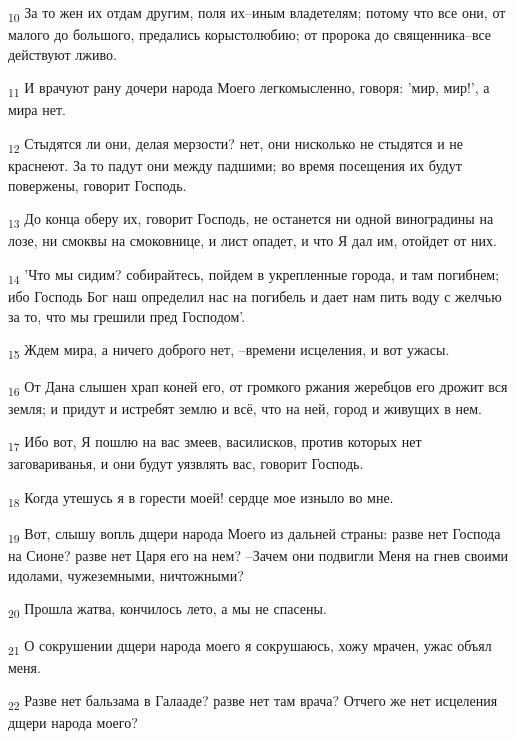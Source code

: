 \begin{tcolorbox}
\textsubscript{10} За то жен их отдам другим, поля их--иным владетелям; потому что все они, от малого до большого, предались корыстолюбию; от пророка до священника--все действуют лживо.
\end{tcolorbox}
\begin{tcolorbox}
\textsubscript{11} И врачуют рану дочери народа Моего легкомысленно, говоря: 'мир, мир!', а мира нет.
\end{tcolorbox}
\begin{tcolorbox}
\textsubscript{12} Стыдятся ли они, делая мерзости? нет, они нисколько не стыдятся и не краснеют. За то падут они между падшими; во время посещения их будут повержены, говорит Господь.
\end{tcolorbox}
\begin{tcolorbox}
\textsubscript{13} До конца оберу их, говорит Господь, не останется ни одной виноградины на лозе, ни смоквы на смоковнице, и лист опадет, и что Я дал им, отойдет от них.
\end{tcolorbox}
\begin{tcolorbox}
\textsubscript{14} 'Что мы сидим? собирайтесь, пойдем в укрепленные города, и там погибнем; ибо Господь Бог наш определил нас на погибель и дает нам пить воду с желчью за то, что мы грешили пред Господом'.
\end{tcolorbox}
\begin{tcolorbox}
\textsubscript{15} Ждем мира, а ничего доброго нет, --времени исцеления, и вот ужасы.
\end{tcolorbox}
\begin{tcolorbox}
\textsubscript{16} От Дана слышен храп коней его, от громкого ржания жеребцов его дрожит вся земля; и придут и истребят землю и всё, что на ней, город и живущих в нем.
\end{tcolorbox}
\begin{tcolorbox}
\textsubscript{17} Ибо вот, Я пошлю на вас змеев, василисков, против которых нет заговариванья, и они будут уязвлять вас, говорит Господь.
\end{tcolorbox}
\begin{tcolorbox}
\textsubscript{18} Когда утешусь я в горести моей! сердце мое изныло во мне.
\end{tcolorbox}
\begin{tcolorbox}
\textsubscript{19} Вот, слышу вопль дщери народа Моего из дальней страны: разве нет Господа на Сионе? разве нет Царя его на нем? --Зачем они подвигли Меня на гнев своими идолами, чужеземными, ничтожными?
\end{tcolorbox}
\begin{tcolorbox}
\textsubscript{20} Прошла жатва, кончилось лето, а мы не спасены.
\end{tcolorbox}
\begin{tcolorbox}
\textsubscript{21} О сокрушении дщери народа моего я сокрушаюсь, хожу мрачен, ужас объял меня.
\end{tcolorbox}
\begin{tcolorbox}
\textsubscript{22} Разве нет бальзама в Галааде? разве нет там врача? Отчего же нет исцеления дщери народа моего?
\end{tcolorbox}
